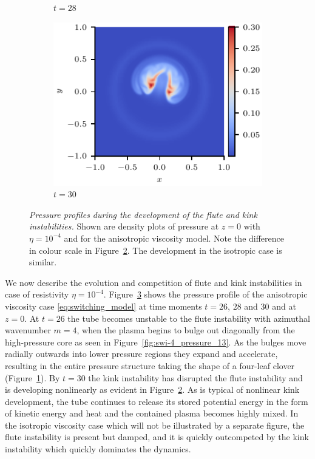 \documentclass[fleqn,usenatbib]{mnras}
\newcommand{\rev}[1]{{\color{red} {#1}}}
\newcommand{\newold}[2]{{#1}{}}
\newcommand{\mycaption}[2]{\caption[#1]{\emph{#1} #2}}
\begin{document}
\begin{figure}
\begin{subfigure}{0.32\textwidth}
      \caption{$t=28$}
      \label{fig:swi-4_pressure_14}
    \end{subfigure}
    \hfill
    \begin{subfigure}{0.32\textwidth}
      \includegraphics[width=\linewidth]{swi-4_pressure_15.pdf}
      \caption{$t=30$}
      \label{fig:swi-4_pressure_15}
    \end{subfigure}
\mycaption{Pressure profiles during the development of the flute and kink
instabilities.}{Shown are density plots of pressure at $z=0$ with $\eta
= 10^{-4}$ and for the anisotropic viscosity model. Note the difference in
colour scale in Figure~\ref{fig:swi-4_pressure_15}. The development in the
isotropic case is similar.}
\label{fig:kink_pressure_slices-4}%
\end{figure}

We now describe the evolution and competition of flute and kink instabilities
in case of resistivity $\eta=10^{-4}$. Figure~\ref{fig:kink_pressure_slices-4}
shows the pressure profile of the anisotropic viscosity case
\eqref{eq:switching_model} at time moments $t=26$, $28$ and $30$ and at $z=0$.
At $t=26$ the tube becomes unstable \rev{to the flute instability} with azimuthal
wavenumber $m=4$, when the plasma begins to  bulge out diagonally from the
high-pressure core as seen in Figure~\ref{fig:swi-4_pressure_13}. As  the
bulges move radially outwards into lower pressure regions they expand and
accelerate, resulting in the entire pressure structure \rev{\newold{}{appearing}} taking the
shape of a four-leaf clover (Figure~\ref{fig:swi-4_pressure_14}). By $t=30$ the
kink instability has disrupted the flute instability and is developing
nonlinearly as evident in Figure~\ref{fig:swi-4_pressure_15}. As is typical of
nonlinear kink development, the tube continues to release its stored potential
energy in the form of kinetic energy and heat and the contained plasma becomes
highly mixed. In the  isotropic viscosity case which will not be illustrated by
a separate figure, the flute instability is present but damped, and it is
quickly outcompeted by the kink instability which quickly dominates the
dynamics. 
\end{document}

